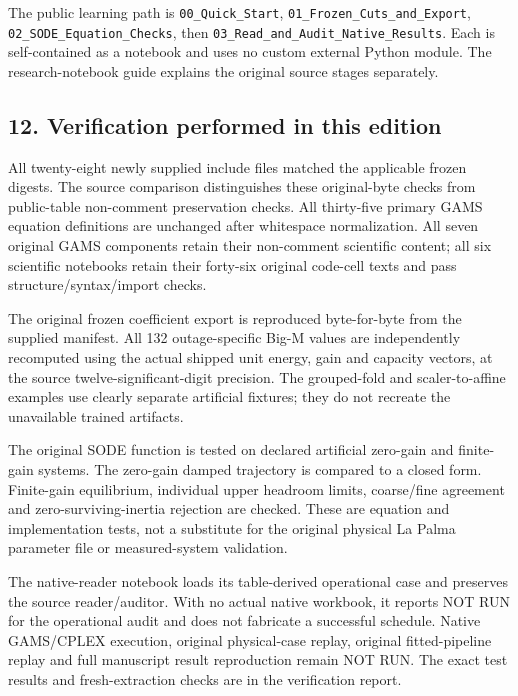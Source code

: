 \documentclass[
  11pt,
  a4paper,
]{article}
\begin{document}
The public learning path is \texttt{00\_Quick\_Start},
\texttt{01\_Frozen\_Cuts\_and\_Export},
\texttt{02\_SODE\_Equation\_Checks}, then
\texttt{03\_Read\_and\_Audit\_Native\_Results}. Each is self-contained
as a notebook and uses no custom external Python module. The
research-notebook guide explains the original source stages separately.

\subsection{12. Verification performed in this
edition}\label{verification-performed-in-this-edition}

All twenty-eight newly supplied include files matched the applicable
frozen digests. The source comparison distinguishes these original-byte
checks from public-table non-comment preservation checks. All
thirty-five primary GAMS equation definitions are unchanged after
whitespace normalization. All seven original GAMS components retain
their non-comment scientific content; all six scientific notebooks
retain their forty-six original code-cell texts and pass
structure/syntax/import checks.

The original frozen coefficient export is reproduced byte-for-byte from
the supplied manifest. All 132 outage-specific Big-M values are
independently recomputed using the actual shipped unit energy, gain and
capacity vectors, at the source twelve-significant-digit precision. The
grouped-fold and scaler-to-affine examples use clearly separate
artificial fixtures; they do not recreate the unavailable trained
artifacts.

The original SODE function is tested on declared artificial zero-gain
and finite-gain systems. The zero-gain damped trajectory is compared to
a closed form. Finite-gain equilibrium, individual upper headroom
limits, coarse/fine agreement and zero-surviving-inertia rejection are
checked. These are equation and implementation tests, not a substitute
for the original physical La Palma parameter file or measured-system
validation.

The native-reader notebook loads its table-derived operational case and
preserves the source reader/auditor. With no actual native workbook, it
reports NOT RUN for the operational audit and does not fabricate a
successful schedule. Native GAMS/CPLEX execution, original physical-case
replay, original fitted-pipeline replay and full manuscript result
reproduction remain NOT RUN. The exact test results and fresh-extraction
checks are in the verification report.
\end{document}

